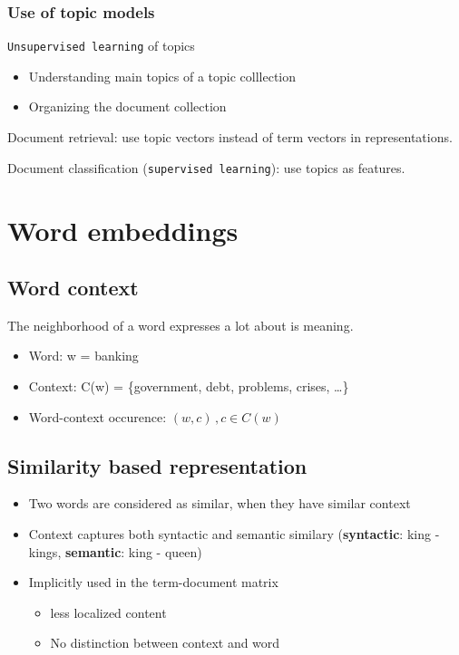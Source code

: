 \subsubsection{Use of topic models}

\texttt{Unsupervised learning} of topics
\begin{itemize}
\item Understanding main topics of a topic colllection
\item Organizing the document collection
\end{itemize}

Document retrieval: use topic vectors  instead of term vectors in
representations.

Document classification (\texttt{supervised learning}): use topics as
features.

\section{Word embeddings}

\subsection{Word context}

The neighborhood of a word expresses a lot about is meaning.
\begin{itemize}
\item Word: w = banking
\item Context: C(w) = \{government, debt, problems, crises, \ldots\}
\item Word-context occurence: $ (w, c)\,, c \in C(w) $
\end{itemize}

\subsection{Similarity based representation}
\begin{itemize}
\item Two words are considered as similar, when they have similar
  context
\item Context captures both syntactic and semantic similary
  (\textbf{syntactic}: king - kings, \textbf{semantic}: king - queen)
\item Implicitly used in the term-document matrix
  \begin{itemize}
  \item less localized content
  \item No distinction between context and word
  \end{itemize}
\end{itemize}

